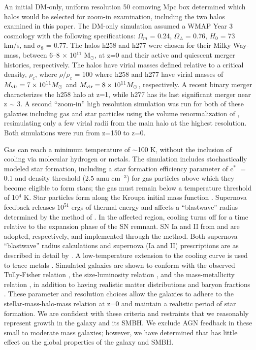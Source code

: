 \documentclass[12pt,headA,chapB]{fiskthesis}
\begin{document}
An initial DM-only, uniform resolution 50 comoving Mpc box determined which halos would be selected for zoom-in examination, including the two halos examined in this paper. The DM-only simulation assumed a WMAP Year 3 cosmology \citep{Spergel2007} with the following specifications: $\Omega _m$ = 0.24, $\Omega _{\Lambda}$ = 0.76, $H_0$ = 73 km/s, and $\sigma _8$ = 0.77. The halos h258 and h277  were chosen for their Milky Way-mass, between 6--8 $\times$ 10$^{11}$  M$_{\odot}$, at z=0 and their active and quiescent merger histories, respectively. The halos have virial masses defined relative to a critical density, $\rho _c$, where $\rho / \rho _c$ = 100 where h258 and h277 have virial masses of $M_{\rm vir} = 7 \times 10^{11} M_{\odot}$ and $M_{\rm vir} = 8 \times 10^{11} M_{\odot}$, respectively. A recent binary merger characterizes the h258 halo at z=1, while h277 has its last significant merger near z $\sim$ 3. A second ``zoom-in'' high resolution simulation was run for both of these galaxies including gas and star particles using the volume renormalization of \cite{Katz1993}, resimulating only a few virial radii from the main halo at the highest resolution. Both simulations were run from z=150 to z=0.  

Gas can reach a minimum temperature of $\sim$100 K, without the inclusion of cooling via molecular hydrogen or metals. The simulation includes stochastically modeled star formation, including a star formation efficiency parameter of c$^*$ $=$ 0.1 and density threshold (2.5 amu cm$^{-3}$) for gas particles above which they become eligible to form stars; the gas must remain below a temperature threshold of 10$^4$ K. Star particles form along the Kroupa initial mass function \citep{Kroupa2001}. Supernova feedback releases $10^{51}$ ergs of thermal energy and affects a ``blastwave'' radius determined by the method of \cite{Ostriker1988}. In the affected region, cooling turns off for a time relative to the expansion phase of the SN remnant. SN Ia and II from \cite{Thielemann1986} and \cite{Woosley1986} are adopted, respectively, and implemented through the \cite{Raiteri1996} method. Both supernova ``blastwave'' radius calculations and supernova (Ia and II) prescriptions are as described in detail by \cite{Stinson2006}. A low-temperature extension to the cooling curve is used to trace metals \citep{Bromm2001}. Simulated galaxies are shown to conform with the observed Tully-Fisher relation \citep{Governato2009}, the size-luminosity relation \citep{Brooks2011}, and the mass-metallicity relation \citep{Brooks2007}, in addition to having realistic matter distributions and baryon fractions \citep{Governato2009a,Guedes2011}. These parameter and resolution choices allow the galaxies to adhere to the stellar-mass-halo-mass relation at z=0 and maintain a realistic period of star formation. \citep{Moster2010,Munshi2013,Brooks2007,Maiolino2008} We are confident with these criteria and restraints that we reasonably represent growth in the galaxy and its SMBH. We exclude AGN feedback in these small to moderate mass galaxies; however, we have determined that has little effect on the global properties of the galaxy and SMBH.
 
\end{document}
